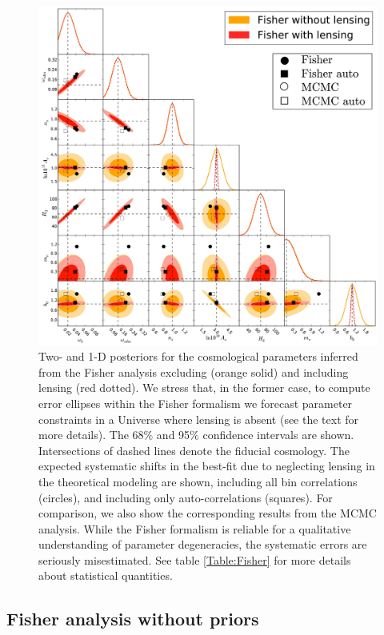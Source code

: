 \begin{figure}[bthp]
  \centering
  \includegraphics[width=\textwidth]{figures/chapter-mnu/triangle_figure_Fisher_bias.pdf}
  \caption{
      Two- and 1-D posteriors for the cosmological parameters inferred from the Fisher analysis excluding (orange solid) and including lensing (red dotted).
    We stress that, in the former case, to compute error ellipses within the Fisher formalism we forecast parameter constraints in a Universe where lensing is absent (see the text for more details).
    The 68\% and 95\% confidence intervals are shown.
    Intersections of dashed lines denote the fiducial cosmology.
The expected systematic shifts in the best-fit due to neglecting lensing in the theoretical modeling are shown, including all bin correlations (circles), and including only auto-correlations (squares).
For comparison, we also show the corresponding results from the MCMC analysis.
While the Fisher formalism is reliable for a qualitative understanding of parameter degeneracies, the systematic errors are seriously misestimated.
    See table \ref{Table:Fisher} for more details about statistical quantities.
}
  \label{fig:fisher}
\end{figure}

\subsection{Fisher analysis without priors}\label{s:fisher}

